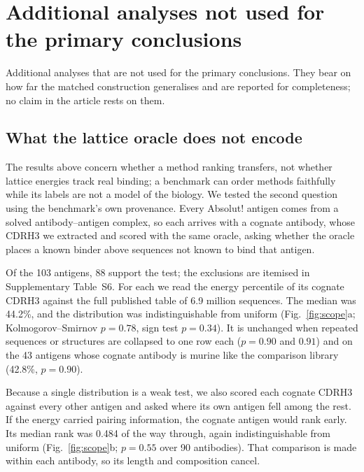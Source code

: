 \documentclass[11pt,a4paper]{article}
\begin{document}
\clearpage

\section*{Additional analyses not used for the primary conclusions}

Additional analyses that are not used for the primary conclusions. They bear on how far the matched construction generalises and are reported for completeness; no claim in the article rests on them.

\subsection*{What the lattice oracle does not encode}

The results above concern whether a method ranking transfers, not whether
lattice energies track real binding; a benchmark can order methods faithfully
while its labels are not a model of the biology. We tested the second question
using the benchmark's own provenance. Every Absolut! antigen comes from a
solved antibody--antigen complex, so each arrives with a cognate antibody,
whose CDRH3 we extracted and scored with the same oracle, asking whether the
oracle places a known binder above sequences not known to bind that antigen.

Of the 103 antigens, 88 support the test; the exclusions are itemised in
Supplementary Table~S6. For each we read the energy percentile of its cognate
CDRH3 against the full published table of 6.9 million sequences. The median was
44.2\%, and the distribution was indistinguishable from uniform
(Fig.~\ref{fig:scope}a; Kolmogorov--Smirnov $p = 0.78$, sign test $p = 0.34$).
It is unchanged when repeated sequences or structures are collapsed to one row
each ($p = 0.90$ and $0.91$) and on the 43 antigens whose cognate antibody is
murine like the comparison library (42.8\%, $p = 0.90$).

Because a single distribution is a weak test, we also scored each cognate CDRH3
against every other antigen and asked where its own antigen fell among the
rest. If the energy carried pairing information, the cognate antigen would rank
early. Its median rank was 0.484 of the way through, again indistinguishable
from uniform (Fig.~\ref{fig:scope}b; $p = 0.55$ over 90 antibodies). That
comparison is made within each antibody, so its length and composition cancel.
\end{document}
